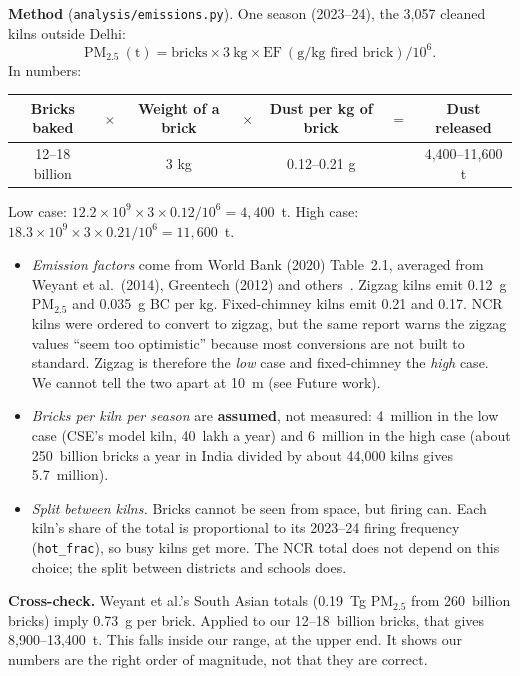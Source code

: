 \documentclass[11pt,a4paper]{article}
\begin{document}
\textbf{Method} (\texttt{analysis/emissions.py}). One season (2023--24), the
3,057 cleaned kilns outside Delhi:
\[
\text{PM}_{2.5}\ (\text{t}) = \text{bricks} \times 3\ \text{kg} \times
\text{EF}\ (\text{g/kg fired brick}) / 10^{6}.
\]
In numbers:
\begin{center}\small
\begin{tabular}{@{}ccccccc@{}}
\toprule
Bricks baked & $\times$ & Weight of a brick & $\times$ & Dust per kg of brick & $=$ & Dust released \\
\midrule
12--18 billion & & 3 kg & & 0.12--0.21 g & & 4,400--11,600 t \\
\bottomrule
\end{tabular}
\end{center}
Low case: $12.2\times10^{9} \times 3 \times 0.12 / 10^{6} = 4{,}400$~t.
High case: $18.3\times10^{9} \times 3 \times 0.21 / 10^{6} = 11{,}600$~t.
\begin{itemize}[leftmargin=*]
\item \emph{Emission factors} come from World Bank (2020) Table~2.1, averaged
from Weyant et al.\ (2014), Greentech (2012) and others~\cite{worldbank2020,weyant2014}.
Zigzag kilns emit 0.12~g PM$_{2.5}$ and 0.035~g BC per kg. Fixed-chimney kilns
emit 0.21 and 0.17. NCR kilns were ordered to convert to zigzag, but the same
report warns the zigzag values ``seem too optimistic'' because most
conversions are not built to standard. Zigzag is therefore the \emph{low} case
and fixed-chimney the \emph{high} case. We cannot tell the two apart at 10~m
(see Future work).
\item \emph{Bricks per kiln per season} are \textbf{assumed}, not measured:
4~million in the low case (CSE's model kiln, 40~lakh a year) and 6~million in
the high case (about 250~billion bricks a year in India divided by about
44,000 kilns gives 5.7~million).
\item \emph{Split between kilns.} Bricks cannot be seen from space, but firing
can. Each kiln's share of the total is proportional to its 2023--24 firing
frequency (\texttt{hot\_frac}), so busy kilns get more. The NCR total does
not depend on this choice; the split between districts and schools does.
\end{itemize}

\textbf{Cross-check.} Weyant et al.'s South Asian totals (0.19~Tg PM$_{2.5}$
from 260~billion bricks) imply 0.73~g per brick. Applied to our 12--18~billion
bricks, that gives 8,900--13,400~t. This falls inside our range, at the upper
end. It shows our numbers are the right order of magnitude, not that they are
correct.
\end{document}
